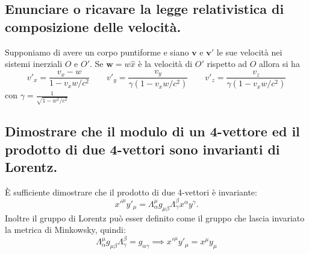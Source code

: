 \subsection[]{ Enunciare o ricavare la legge relativistica di composizione delle velocità.}
Supponiamo di avere un corpo puntiforme e siano $\boldsymbol{v}$ e $\boldsymbol{v'}$ le sue velocità nei sistemi inerziali $O$ e  $O'$.
Se  $\boldsymbol{w} = w \hat{x}$ è la velocità di $O'$ rispetto ad $O$ allora si ha 
\[
	v'_{x} = \frac{v_{x} - w}{1 - v_{x}w/c^{2}} \quad \quad
	v'_{y} = \frac{v_{y}}{\gamma \left( 1 - v_{x}w/c^{2} \right) } \quad \quad
	v'_{z} = \frac{v_{z}}{\gamma \left( 1 - v_{x}w/c^{2} \right) }
\]
con $\gamma = \frac{1}{\sqrt{1 - w^{2}/c^{2}}}$

\subsection[]{ Dimostrare che il modulo di un 4-vettore ed il prodotto di due 4-vettori sono invarianti di Lorentz.} 
È sufficiente dimostrare che il prodotto di due 4-vettori è invariante:
\[
	x'^{\mu} y'_{\mu} = \Lambda^{\mu}_{\alpha} g_{\mu \beta} \Lambda^{\beta}_{\gamma} x^{\alpha} y^{\gamma}
.\]
Inoltre il gruppo di Lorentz può esser definito come il gruppo che lascia invariato la metrica di Minkowsky, quindi:
\[
	\Lambda^{\mu}_{\alpha} g_{\mu \beta} \Lambda^{\beta}_{\gamma} = g_{\alpha \gamma} \implies x'^{\mu}y'_{\mu} = x^{\mu}y_{\mu}
\]  
